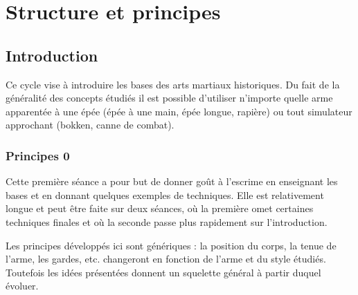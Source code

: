 \section{Structure et principes}


\subsection{Introduction}


Ce cycle vise à introduire les bases des arts martiaux historiques.
Du fait de la généralité des concepts étudiés il est possible d'utiliser n'importe quelle arme apparentée à une épée (épée à une main, épée longue, rapière) ou tout simulateur approchant (bokken, canne de combat).

\newpage
\subsubsection{Principes 0}


Cette première séance a pour but de donner goût à l'escrime en enseignant les bases et en donnant quelques exemples de techniques.
Elle est relativement longue et peut être faite sur deux séances, où la première omet certaines techniques finales et où la seconde passe plus rapidement sur l'introduction.

Les principes développés ici sont génériques : la position du corps, la tenue de l'arme, les gardes, etc. changeront en fonction de l'arme et du style étudiés.
Toutefois les idées présentées donnent un squelette général à partir duquel évoluer.


